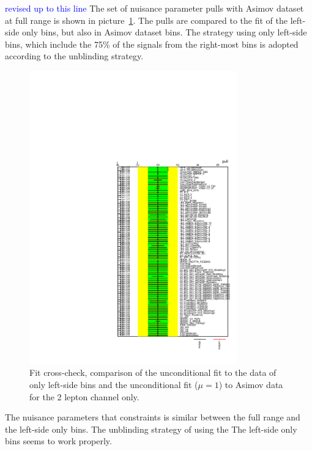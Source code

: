 \textcolor{blue}{revised up to this line}
The set of nuisance parameter pulls with Asimov dataset at full range is shown in picture~\ref{fig:fit_2lep_pullcomp}.
The pulls are compared to the fit of the left-side only bins, but also in Asimov dataset bins.
The strategy using only left-side bins, which include the 75\% of the signals from the right-most bins is adopted according to the unblinding strategy.
\begin{figure}[ht]
      \centering
        \includegraphics[width=0.8\textwidth]{figures/2lep/FitResults/fill_2lep_pullcomp.pdf}
        \caption{Fit cross-check, comparison of the unconditional fit to the data of only left-side bins and the unconditional fit ($\mu=1$) to Asimov data for the 2 lepton channel only.}
       \label{fig:fit_2lep_pullcomp}
\end{figure}
The nuisance parameters that constraints is similar between the full range and the left-side only bins. The unblinding strategy of using the The left-side only bins seems to work properly.\\

